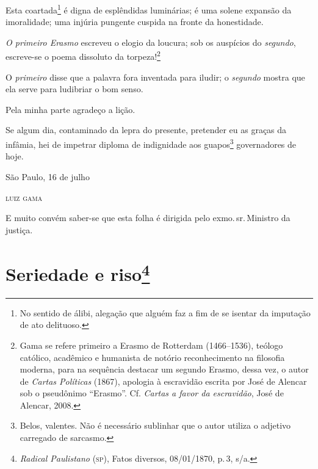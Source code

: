 Esta coartada\footnote{ No sentido de álibi, alegação que alguém faz a
  fim de se isentar da imputação de ato delituoso.} é digna de
esplêndidas luminárias; é uma solene expansão da imoralidade; uma
injúria pungente cuspida na fronte da honestidade.

\emph{O primeiro Erasmo} escreveu o elogio da loucura; sob os
auspícios do \emph{segundo}, escreve-se o poema dissoluto da
torpeza!\footnote{ Gama se refere primeiro a Erasmo de Rotterdam
  (1466--1536), teólogo católico, acadêmico e humanista de notório
  reconhecimento na filosofia moderna, para na sequência destacar um
  segundo Erasmo, dessa vez, o autor de \emph{Cartas Políticas} (1867),
  apologia à escravidão escrita por José de Alencar sob o pseudônimo
  ``Erasmo''. Cf. \emph{Cartas a favor da escravidão}, José de Alencar,
  2008.}

O \emph{primeiro} disse que a palavra fora inventada para iludir; o
\emph{segundo} mostra que ela serve para ludibriar o bom senso.

Pela minha parte agradeço a lição.

Se algum dia, contaminado da lepra do presente, pretender eu as graças
da infâmia, hei de impetrar diploma de indignidade aos guapos\footnote{
  Belos, valentes. Não é necessário sublinhar que o autor utiliza o
  adjetivo carregado de sarcasmo.} governadores de hoje.

\begin{flushright}
São Paulo, 16 de julho

\textsc{luiz gama}
\end{flushright}

\asterisc{}

E muito convém saber-se que esta folha é dirigida pelo exmo.\,sr.\,Ministro da justiça.

\chapter{Seriedade e riso\footnote{\emph{Radical Paulistano} (\textsc{sp}), Fatos diversos,
  08/01/1870, p.\,3, s/a.}} %


